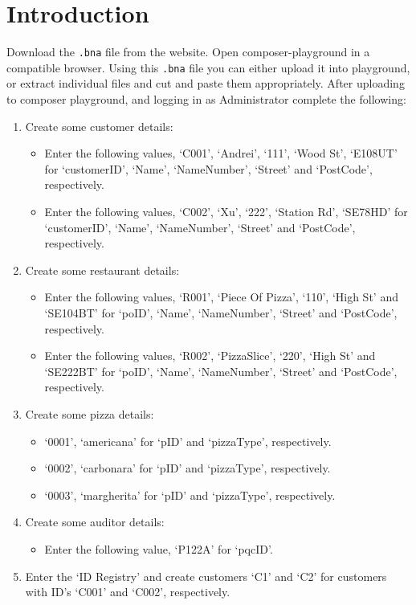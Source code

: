 \section{Introduction}
Download the {\tt .bna} file from the website. Open composer-playground in a compatible browser. Using this {\tt .bna} file you can either upload it into playground, or extract individual files and cut and paste them appropriately. After uploading to composer playground, and logging in as Administrator  complete the following:
\begin{enumerate}
	\item Create some customer details:
		\begin{itemize}
			\item Enter the following values, `C001', `Andrei', `111', `Wood St', `E108UT' for `customerID', `Name', `NameNumber', `Street' and `PostCode', respectively. 
			\item Enter the following values, `C002', `Xu', `222', `Station Rd', `SE78HD' for `customerID', `Name', `NameNumber', `Street' and `PostCode', respectively. 
		\end{itemize}
	\item Create some restaurant details:
		\begin{itemize}
			\item Enter the following values, `R001', `Piece Of Pizza', `110', `High St' and `SE104BT' for `poID', `Name', `NameNumber', `Street' and `PostCode', respectively. 
			\item Enter the following values, `R002', `PizzaSlice', `220', `High St' and `SE222BT' for `poID', `Name', `NameNumber', `Street' and `PostCode', respectively. 
		\end{itemize}
	\item Create some pizza details:
		\begin{itemize}
			\item `0001', `americana' for `pID' and `pizzaType', respectively.
			\item `0002', `carbonara' for `pID' and `pizzaType', respectively.
			\item `0003', `margherita' for `pID' and `pizzaType', respectively.
		\end{itemize}
	\item Create some auditor details:
		\begin{itemize}
			\item Enter the following value, `P122A' for `pqcID'. 
		\end{itemize}
	\item Enter the `ID Registry' and create customers `C1' and `C2' for customers with ID's `C001' and `C002', respectively.

\end{enumerate}
